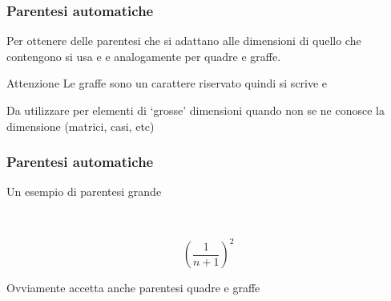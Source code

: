 \documentclass[svgnames,%
	ucs,%
	pdftex]{guitbeamer}
\begin{document}
\begin{frame}
  \frametitle{Parentesi automatiche}
	Per ottenere delle parentesi che si adattano alle dimensioni di quello che contengono si usa  e  e analogamente per quadre e graffe.
	\begin{block}{Attenzione}
		Le graffe sono un carattere riservato quindi si scrive  e 
	\end{block}
  \bigskip
	Da utilizzare per elementi di `grosse' dimensioni quando non se ne conosce la dimensione (matrici, casi, etc)
\end{frame}
\begin{frame}
  \frametitle{Parentesi automatiche}
	Un esempio di parentesi grande
	\begin{LaTeXcode}
		\\[\n
		 \hspace*{5ex}\alert{\\left(}\\frac\{1\}\{n+1\}\alert{\\right)}\textasciicircum 2\n
		\\]
	\end{LaTeXcode}
	\begin{LaTeXoutput}
		\[
			\left(\frac{1}{n+1}\right)^2
		\]
	\end{LaTeXoutput}
	Ovviamente  accetta anche parentesi quadre e graffe
\end{frame}
\end{document}
